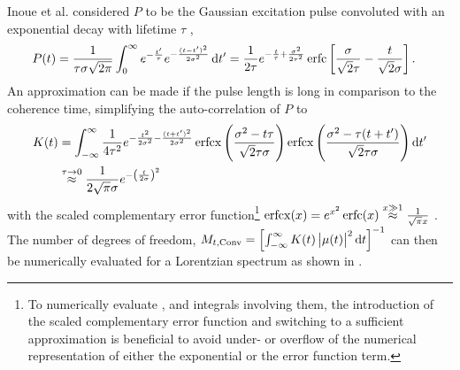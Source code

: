 Inoue et al. considered $P$ to be the Gaussian excitation pulse convoluted with an exponential decay with lifetime $\tau$ \cite{inoue2019,butz2015},
\begin{align}
P(t)&=\frac{1}{\tau\sigma\sqrt{2\pi}} \int_0^{\infty} e^{-\frac{t^{\prime}}{\tau}} 
e^{-\frac{(t-t^{\prime})^2}{2\sigma^2}}\operatorname{\mathrm{d}\!} t^{\prime}
=\frac{1}{2\tau}e^{-\frac{t}{\tau}+\frac{\sigma^2}{2\tau^2}}
\operatorname{erfc}\left[
\frac{\sigma}{\sqrt{2}\tau}
-\frac{t}{\sqrt{2}\sigma}
	\right] .
	\label{eq:pfull}
	\end{align}
An approximation can be made if the pulse length is long in comparison to the coherence time, simplifying the auto-correlation of $P$ to
\begin{align}
K(t)&=\int_{-\infty}^\infty \frac{1}{4
	\tau ^2}e^{-\frac{t^2}{2 \sigma ^2}-\frac{(t+t')^2}{2 \sigma ^2}}
\operatorname{erfcx}\left(\frac{\sigma^2 -t \tau }{\sqrt{2} \tau \sigma}\right)
\operatorname{erfcx}\left(\frac{\sigma^2 -\tau  (t+t')}{\sqrt{2} \tau \sigma }\right) \operatorname{\mathrm{d}\!} t' \nonumber \\
&\stackrel{\tau \rightarrow 0}{\approx} \frac{1}{2\sqrt{\pi}\sigma} e^{-\left(\frac{t}{2\sigma}\right)^2} 
\label{eq:kapprox}
\end{align}
with the scaled complementary error function\footnote{To numerically evaluate ,  and integrals involving them, the introduction of the scaled complementary error function and switching to a sufficient approximation is beneficial to avoid under- or overflow of the numerical representation of either the exponential or the error function term.} $\operatorname{erfcx}(x)=e^{x^2}\operatorname{erfc}(x)\stackrel{x\gg1}{\approx}  \frac{1}{\sqrt{\pi}x}$
   \cite{ren2007}.
The number of degrees of freedom, $M_{t,\text{Conv}}=\left[\int_{-\infty}^{\infty} K(t) \left|\mu(t)\right|^2\operatorname{\mathrm{d}\!} t\right]^{-1}$  can then be numerically evaluated  for a Lorentzian spectrum as shown in .

